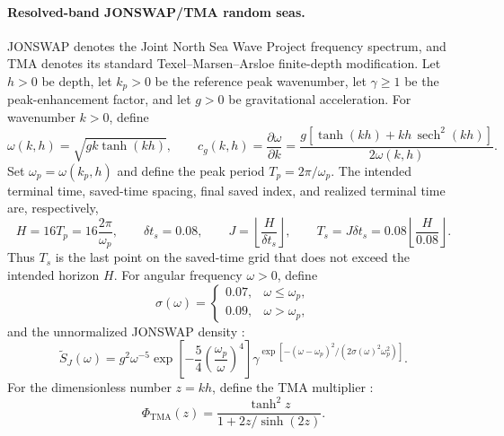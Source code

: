 \paragraph{Resolved-band JONSWAP/TMA random seas.}
JONSWAP denotes the Joint North Sea Wave Project frequency spectrum, and TMA
denotes its standard Texel--Marsen--Arsloe finite-depth
modification.  Let $h>0$ be depth, let $k_p>0$ be the reference peak
wavenumber, let $\gamma\geq1$ be the peak-enhancement factor, and let $g>0$
be gravitational acceleration.  For wavenumber $k>0$, define
\begin{equation}
  \omega(k,h)=\sqrt{gk\tanh(kh)},\qquad
  c_g(k,h)=\frac{\partial\omega}{\partial k}
  =
  \frac{g[\tanh(kh)+kh\,\operatorname{sech}^2(kh)]}
       {2\omega(k,h)}.
  \label{eq:paper-random-dispersion}
\end{equation}
Set $\omega_p=\omega(k_p,h)$ and define the peak period
$T_p=2\pi/\omega_p$.  The intended terminal time, saved-time spacing, final
saved index, and realized terminal time are, respectively,
\begin{equation}
  H=16T_p=16\frac{2\pi}{\omega_p},
  \qquad
  \delta t_s=0.08,
  \qquad
  J=\left\lfloor\frac{H}{\delta t_s}\right\rfloor,
  \qquad
  T_s=J\delta t_s
      =0.08\left\lfloor\frac{H}{0.08}\right\rfloor.
  \label{eq:paper-random-horizon}
\end{equation}
Thus \(T_s\) is the last point on the saved-time grid that does not exceed
the intended horizon \(H\).  For angular frequency $\omega>0$, define
\begin{equation}
  \sigma(\omega)=
  \begin{cases}
    0.07,&\omega\leq\omega_p,\\
    0.09,&\omega>\omega_p,
  \end{cases}
  \label{eq:paper-jonswap-width}
\end{equation}
and the unnormalized JONSWAP density \cite{hasselmann1973}:
\begin{equation}
  \widetilde S_J(\omega)
  =
  g^2\omega^{-5}
  \exp\!\left[-\frac54\left(\frac{\omega_p}{\omega}\right)^4\right]
  \gamma^{\exp[-(\omega-\omega_p)^2/
    (2\sigma(\omega)^2\omega_p^2)]}.
  \label{eq:paper-jonswap-density}
\end{equation}
For the dimensionless number $z=kh$, define the TMA multiplier
\cite{bouws1985}:
\begin{equation}
  \Phi_{\mathrm{TMA}}(z)
  =
  \frac{\tanh^2z}{1+2z/\sinh(2z)}.
  \label{eq:paper-tma-factor}
\end{equation}
